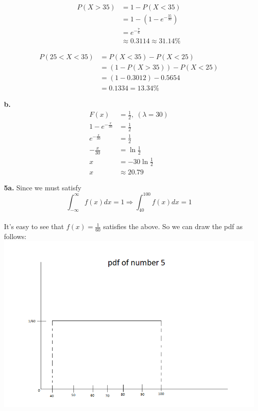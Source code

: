 \documentclass[12pt]{report}
\begin{document}
\begin{align*}
P(X > 35) &= 1 - P(X < 35)\\
&= 1 - \left(1 - e^{-\frac{35}{30}}\right)\\
&= e^{-\frac{7}{6}}\\
&\approx \boxed{0.3114 \approx 31.14\%}
\end{align*}

\begin{align*}
P(25 < X < 35) &= P(X < 35) - P(X < 25)\\
&= (1-P(X > 35)) - P(X < 25)\\
&= (1 - 0.3012)-0.5654\\
&= \boxed{0.1334 = 13.34\%}
\end{align*}

\noindent \textbf{b.}
\begin{align*}
F(x) &= \frac{1}{2}, \; (\lambda = 30)\\
1-e^{-\frac{x}{30}} &= \frac{1}{2}\\
e^{-\frac{x}{30}} &= \frac{1}{2} \\
-\frac{x}{30} &= \ln{\frac{1}{2}}\\
x &= -30\ln{\frac{1}{2}}\\
x &\approx \boxed{20.79}
\end{align*}

\pagebreak

\noindent \textbf{5a.} Since we must satisfy \\

$$ \int_{-\infty}^{\infty} f(x)dx = 1 \Rightarrow \int_{40}^{100}f(x)dx = 1$$\\
\noindent It's easy to see that $f(x) = \frac{1}{60}$ satisfies the above. So we can draw the pdf as follows:\\

\includegraphics[scale=.7]{hw3_5}
\end{document}

